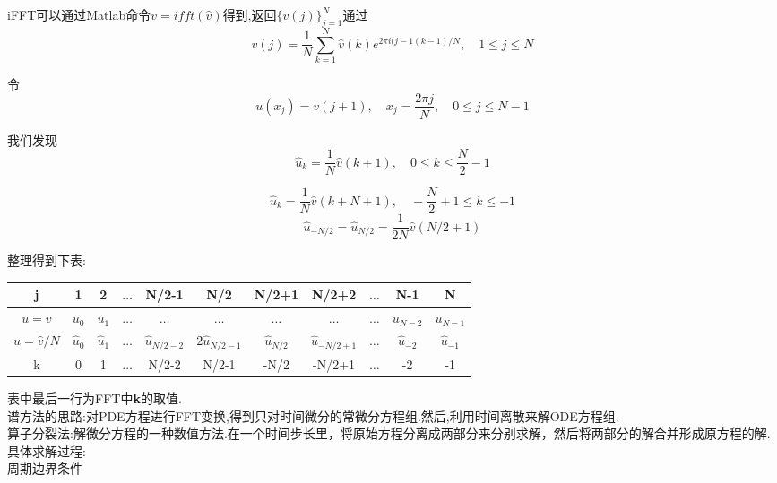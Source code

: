 \documentclass[12pt]{article}
\begin{document}
\begin{CJK}{UTF8}{gkai}
 iFFT可以通过Matlab命令$v=ifft(\hat  {v})$得到,返回$\{v(j)\}_{j=1}^N$通过\\
 
 $$v(j)=\dfrac{1}{N}\sum_{k=1}^{N}\hat{v}(k)e^{2\pi i(j-1(k-1)/N}, \quad 1\leq j\leq N$$
 
 令\\
 
 $$u(x_j)=v(j+1),\quad x_j=\dfrac{2\pi j}{N},\quad 0\leq j \leq N-1$$
 
 我们发现\\
 
 $$ \hat{u}_k=\dfrac{1}{N}\hat{v}(k+1), \quad 0\leq k \leq \dfrac{N}{2}-1$$
 
 $$ \hat{u}_k=\dfrac{1}{N}\hat{v}(k+N+1), \quad -\dfrac{N}{2}+1\leq k \leq-1$$
 $$ \hat{u}_{-N/2}=\hat{u}_{N/2} = \dfrac{1}{2N}\hat{v}(N/2+1)$$
 
 整理得到下表:\\
 
\begin{table}[H]
	\centering
	\begin{tabular}{ccccccccccc}
		
		\toprule
		j&1& 2  &$\dots$&N/2-1&N/2&N/2+1&N/2+2&$\dots$&N-1&N\\
		\midrule    
       $u=v$&$u_0$&$u_1$&$\dots$&$\dots$&$\dots$&$\dots$&$\dots$&$\dots$&$u_{N-2}$&$u_{N-1}$\\
       $\hat{u}=\hat{v}/N$&$\hat{u}_0$&$\hat{u}_1$&$\dots$&$\hat{u}_{N/2-2}$&$2\hat{u}_{N/2-1}$&$\hat{u}_{N/2}$&$\hat{u}_{-N/2+1}$&$\dots$&$\hat{u}_{-2}$&$\hat{u}_{-1}$\\
       k&0&1&$\dots$&N/2-2&N/2-1&-N/2&-N/2+1&$\dots$&-2&-1\\
		\bottomrule
	\end{tabular}
\end{table} 

表中最后一行为FFT中\textbf{k}的取值.\\
	 

    谱方法的思路:对PDE方程进行FFT变换,得到只对时间微分的常微分方程组.然后,利用时间离散来解ODE方程组.\\
    
    算子分裂法:解微分方程的一种数值方法.在一个时间步长里，将原始方程分离成两部分来分别求解，然后将两部分的解合并形成原方程的解.\\
    
    具体求解过程:\\
    
    周期边界条件\\
   

\end{CJK}
\end{document}
